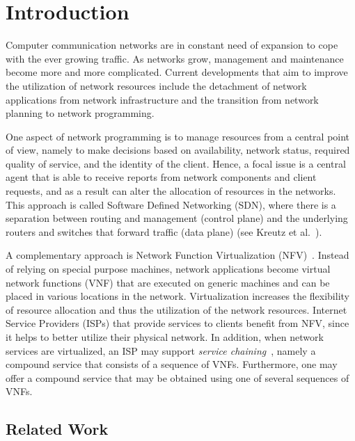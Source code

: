 \section{Introduction}


Computer communication networks are in constant need of expansion to
cope with the ever growing traffic.  As networks grow, management and
maintenance become more and more complicated.
%
Current developments that aim to improve the utilization of network
resources include the detachment of network applications from network
infrastructure and the transition from network planning to network
programming.

One aspect of network programming is to manage resources from a
central point of view, namely to make decisions based on availability,
network status, required quality of service, and the identity of the
client.  Hence, a focal issue is a central agent that is able to
receive reports from network components and client requests, and as a
result can alter the allocation of resources in the networks.  This
approach is called Software Defined Networking (SDN), where there is a
separation between routing and management (control plane) and the
underlying routers and switches that forward traffic (data plane) (see
Kreutz et al.~\cite{KRVRAU15}).

A complementary approach is Network Function Virtualization
(NFV)~\cite{NFV12}.  Instead of relying on special purpose machines,
network applications become virtual network functions (VNF) that are
executed on generic machines and can be placed in various locations in
the network.  Virtualization increases the flexibility of resource
allocation and thus the utilization of the network resources.
%
Internet Service Providers (ISPs) that provide services to clients
benefit from NFV, since it helps to better utilize their physical
network.  In addition, when network services are virtualized, an ISP
may support \emph{service chaining}~\cite{ServiceChaining15}, namely a
compound service that consists of a sequence of VNFs.  Furthermore,
one may offer a compound service that may be obtained using one of
several sequences of VNFs.


\subsection{Related Work}

